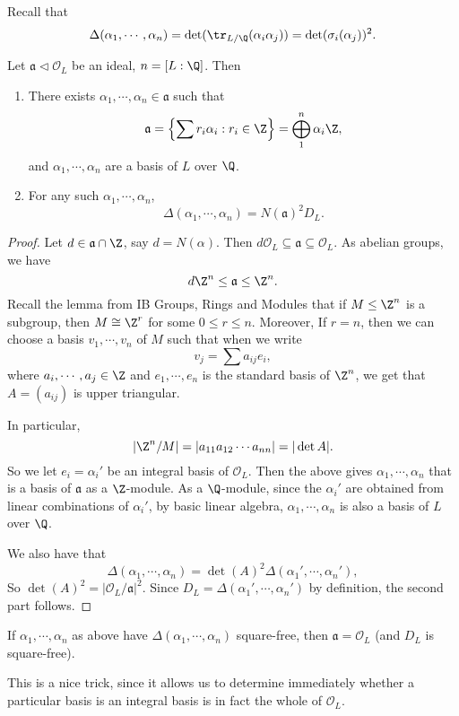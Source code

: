 \documentclass[a4paper]{article}
\begin{document}
Recall that
\[
  \Delta(\alpha_1, \cdots, \alpha_n) = \det(\tr_{L/\Q}(\alpha_i\alpha_j)) = \det(\sigma_i(\alpha_j))^2.
\]
\begin{lemma}
  Let $\mathfrak{a} \lhd \mathcal{O}_L$ be an ideal, $n = [L:\Q]$. Then
  \begin{enumerate}
    \item There exists $\alpha_1, \cdots, \alpha_n \in \mathfrak{a}$ such that
      \[
        \mathfrak{a} = \left\{ \sum r_i \alpha_i : r_i \in \Z\right\} = \bigoplus_{1}^n \alpha_i\Z,
      \]
      and $\alpha_1, \cdots, \alpha_n$ are a basis of $L$ over $\Q$.
    \item For any such $\alpha_1, \cdots, \alpha_n$,
      \[
        \Delta (\alpha_1, \cdots, \alpha_n) = N(\mathfrak{a})^2 D_L.
      \]
  \end{enumerate}
\end{lemma}

\begin{proof}
  Let $d \in \mathfrak{a} \cap \Z$, say $d = N(\alpha)$. Then $d \mathcal{O}_L \subseteq \mathfrak{a} \subseteq \mathcal{O}_L$. As abelian groups, we have
  \[
    d \Z^n \leq \mathfrak{a} \leq \Z^n.
  \]
  Recall the lemma from IB Groups, Rings and Modules that if $M \leq \Z^n$ is a subgroup, then $M \cong \Z^r$ for some $0 \leq r \leq n$. Moreover, If $r = n$, then we can choose a basis $v_1, \cdots, v_n$ of $M$ such that when we write
  \[
    v_j = \sum a_{ij} e_i,
  \]
  where $a_i, \cdots, a_j \in \Z$ and $e_1, \cdots, e_n$ is the standard basis of $\Z^n$, we get that $A = (a_{ij})$ is upper triangular.

  In particular,
  \[
    |\Z^n/M| = |a_{11} a_{12} \cdots a_{nn}| = |\det A|.
  \]
  So we let $e_i = \alpha_i'$ be an integral basis of $\mathcal{O}_L$. Then the above gives $\alpha_1, \cdots, \alpha_n$ that is a basis of $\mathfrak{a}$ as a $\Z$-module. As a $\Q$-module, since the $\alpha_i'$ are obtained from linear combinations of $\alpha_i'$, by basic linear algebra, $\alpha_1, \cdots, \alpha_n$ is also a basis of $L$ over $\Q$.

  We also have that
  \[
    \Delta(\alpha_1, \cdots, \alpha_n) = \det(A)^2 \Delta(\alpha_1', \cdots, \alpha_n'),
  \]
  So $\det(A)^2 = |\mathcal{O}_L/\mathfrak{a}|^2$. Since $D_L = \Delta(\alpha_1', \cdots, \alpha_n')$ by definition, the second part follows.
\end{proof}

\begin{cor}
  If $\alpha_1, \cdots, \alpha_n$ as above have $\Delta(\alpha_1, \cdots, \alpha_n)$ square-free, then $\mathfrak{a} = \mathcal{O}_L$ (and $D_L$ is square-free).
\end{cor}
This is a nice trick, since it allows us to determine immediately whether a particular basis is an integral basis is in fact the whole of $\mathcal{O}_L$.
\end{document}
